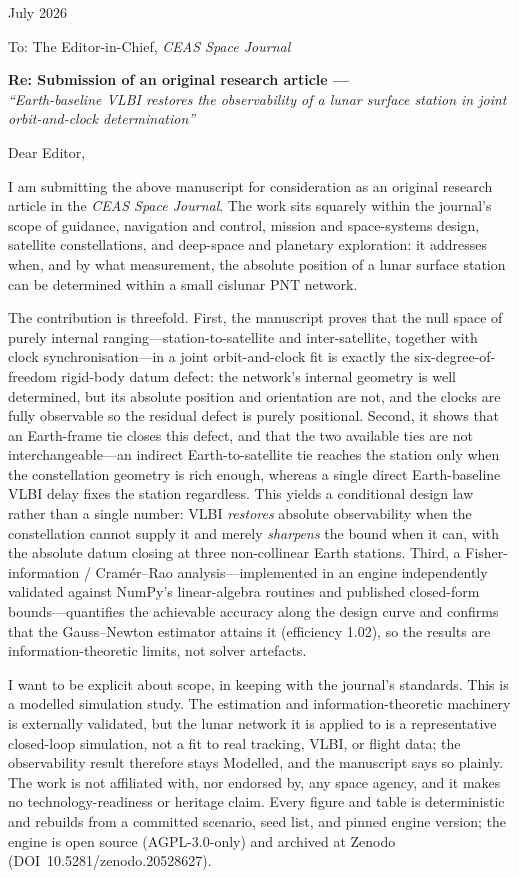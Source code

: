 \documentclass[11pt]{article}
\begin{document}
 July 2026

\medskip
\noindent To: The Editor-in-Chief, \emph{CEAS Space Journal}

\medskip
\noindent\textbf{Re: Submission of an original research article —}\\
\emph{``Earth-baseline VLBI restores the observability of a lunar surface station
in joint orbit-and-clock determination''}

\medskip
\noindent Dear Editor,

I am submitting the above manuscript for consideration as an original research
article in the \emph{CEAS Space Journal}. The work sits squarely within the
journal's scope of guidance, navigation and control, mission and space-systems
design, satellite constellations, and deep-space and planetary exploration: it
addresses when, and by what measurement, the absolute position of a lunar surface
station can be determined within a small cislunar PNT network.

The contribution is threefold. First, the manuscript proves that the null space of
purely internal ranging---station-to-satellite and inter-satellite, together with
clock synchronisation---in a joint orbit-and-clock fit is exactly the
six-degree-of-freedom rigid-body datum defect: the network's internal geometry is
well determined, but its absolute position and orientation are not, and the clocks
are fully observable so the residual defect is purely positional. Second, it shows
that an Earth-frame tie closes this defect, and that the two available ties are not
interchangeable---an indirect Earth-to-satellite tie reaches the station only when
the constellation geometry is rich enough, whereas a single direct Earth-baseline
VLBI delay fixes the station regardless. This yields a conditional design law
rather than a single number: VLBI \emph{restores} absolute observability when the
constellation cannot supply it and merely \emph{sharpens} the bound when it can,
with the absolute datum closing at three non-collinear Earth stations. Third, a
Fisher-information / Cram\'er--Rao analysis---implemented in an engine
independently validated against NumPy's linear-algebra routines and published
closed-form bounds---quantifies the achievable accuracy along the design curve and
confirms that the Gauss--Newton estimator attains it (efficiency 1.02), so the
results are information-theoretic limits, not solver artefacts.

I want to be explicit about scope, in keeping with the journal's standards. This is
a modelled simulation study. The estimation and information-theoretic machinery is
externally validated, but the lunar network it is applied to is a representative
closed-loop simulation, not a fit to real tracking, VLBI, or flight data; the
observability result therefore stays Modelled, and the manuscript says so plainly.
The work is not affiliated with, nor endorsed by, any space agency, and it makes no
technology-readiness or heritage claim. Every figure and table is deterministic and
rebuilds from a committed scenario, seed list, and pinned engine version; the engine
is open source (AGPL-3.0-only) and archived at Zenodo
(DOI~10.5281/zenodo.20528627).
\end{document}
